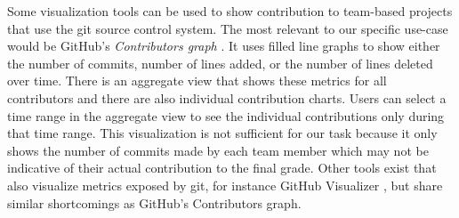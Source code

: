 \documentclass[../manifest.tex]{subfiles}
\begin{document}
Some visualization tools can be used to show contribution to team-based projects that use the git source control system. The most relevant to our specific use-case would be GitHub's \textit{Contributors graph} \cite{github-contrib}. It uses filled line graphs to show either the number of commits, number of lines added, or the number of lines deleted over time. There is an aggregate view that shows these metrics for all contributors and there are also individual contribution charts. Users can select a time range in the aggregate view to see the individual contributions only during that time range. This visualization is not sufficient for our task because it only shows the number of commits made by each team member which may not be indicative of their actual contribution to the final grade. Other tools exist that also visualize metrics exposed by git, for instance GitHub Visualizer \cite{ghv}, but share similar shortcomings as GitHub's Contributors graph.
\end{document}
